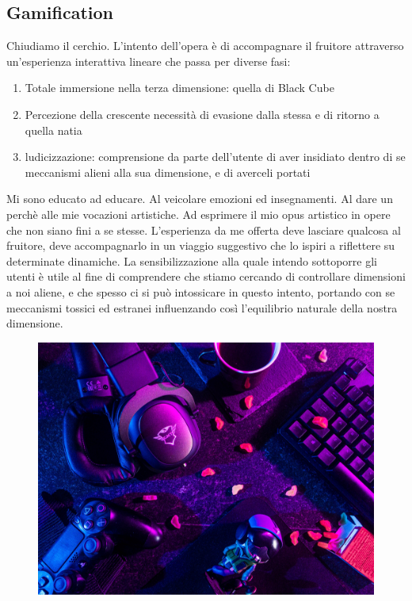 \subsection{Gamification}
Chiudiamo il cerchio. L'intento dell'opera è di accompagnare il fruitore attraverso un'esperienza interattiva lineare che passa per diverse fasi:

\begin{enumerate}
	\item Totale immersione nella terza dimensione: quella di Black Cube
	\item Percezione della crescente necessità di evasione dalla stessa e di ritorno a quella natia
	\item ludicizzazione: comprensione da parte dell'utente di aver insidiato dentro di se meccanismi alieni alla sua dimensione, e di averceli portati
\end{enumerate}

Mi sono educato ad educare. Al veicolare emozioni ed insegnamenti. Al dare un perchè alle mie vocazioni artistiche. Ad esprimere il mio opus artistico in opere che non siano fini a se stesse. L'esperienza da me offerta deve lasciare qualcosa al fruitore, deve accompagnarlo in un viaggio suggestivo che lo ispiri a riflettere su determinate dinamiche.
La sensibilizzazione alla quale intendo sottoporre gli utenti è utile al fine di comprendere che stiamo cercando di controllare dimensioni a noi aliene, e che spesso ci si può intossicare in questo intento, portando con se meccanismi tossici ed estranei influenzando così l'equilibrio naturale della nostra dimensione.
	
	\begin{figure}[h]
		\begin{center}
			\includegraphics[width=.47\textwidth]{img/image9.jpg}
			\label{gr01}
		\end{center}
	\end{figure}

	
	
	\vfill\null
	
	\newpage %
	
